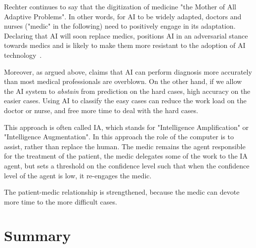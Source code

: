 \documentclass[fleqn,10pt]{wlscirep}
\begin{document}
Rechter continues to say that the digitization of medicine "the Mother of All Adaptive Problems". In other words, for AI to be widely adapted, doctors and nurses ("medic" in the following) need to positively engage in its adaptation. Declaring that AI will soon replace medics, positions AI in an adversarial stance towards medics and is likely to make them more resistant to the adoption of AI technology~\cite{topol2019deep}.

Moreover, as argued above, claims that AI can perform diagnosis more accurately than most medical professionals are overblown. On the other hand, if we allow the AI system to {\em abstain} from prediction on the hard cases, high accuracy on the easier cases. Using AI to classify the easy cases can reduce the work load on the doctor or nurse, and free more time to deal with the hard cases.

This approach is often called IA, which stands for "Intelligence Amplification" or "Intelligence Augmentation". In this approach the role of the computer is to assist, rather than replace the human.  The medic remains the agent responsible for the treatment of the patient, the medic delegates some of the work to the IA agent, but sets a threshold on the confidence level such that when the confidence level of the agent is low, it re-engages the medic.

The patient-medic relationship is strengthened, because the medic can devote more time to the more difficult cases.

\section{Summary}

 


\end{document}
